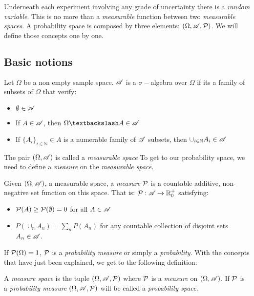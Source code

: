 

Underneath each experiment involving any grade of uncertainty there is a \emph{random variable}. This is no more than a \emph{measurable} function between two \emph{measurable spaces}.
A probability space is composed by three elements: $(\Omega, \mathscr{A}, \mathcal{P})$. We will define those concepts one by one.

\subsection{Basic notions}

\begin{ndef}Let $\Omega$ be a non empty sample space. $\mathscr{A}$ is a $\sigma-$algebra over $\Omega$ if its a family of subsets of $\Omega$ that verify:
\begin{itemize}
  \item $\emptyset \in \mathscr{A}$
  \item If $A \in \mathscr{A}$, then $\Omega \textbackslash A \in \Alg$
  \item If $\{A_i\}_{i \in \mathbb N} \in A$ is a numerable family of $\mathscr{A}$ subsets, then $\cup_{i \in \mathbb N} A_i \in \mathscr{A}$
\end{itemize}
\end{ndef}


The pair $(\Omega,\mathscr{A})$ is called a \emph{measurable space} To get to our probability space, we need to define a \emph{measure} on the \emph{measurable space}.

\begin{ndef}
Given $(\Omega,\mathscr{A})$, a measurable space, a \emph{measure} $\mathcal{P}$ is a countable additive, non-negative set function on this space. That is: $\mathcal{P}: \mathscr{A} \to \mathbb R_0^+$ satisfying:
\begin{itemize}
  \item $\mathcal{P}(A) \geq \mathcal{P}(\emptyset) = 0$ for all $A \in \mathscr{A}$
  \item $P(\cup_n A_n) = \sum_n P(A_n)$ for any countable collection of disjoint sets $A_n \in \mathscr{A}$.
\end{itemize}
\end{ndef}

If $\mathcal{P}(\Omega) = 1$, $\mathcal{P}$ is a \emph{probability measure} or simply a \emph{probability}. With the concepts that have just been explained, we get to the following definition:

\begin{ndef}
A \emph{measure space} is the tuple $(\Omega, \mathscr{A},\mathcal{P})$ where $\mathcal{P}$ is a \emph{measure} on $(\Omega, \mathscr{A})$. If $\mathcal{P}$ is a \emph{probability measure} $(\Omega,\mathscr{A},\mathcal{P})$ will be called a \emph{probability space}.
\end{ndef}

